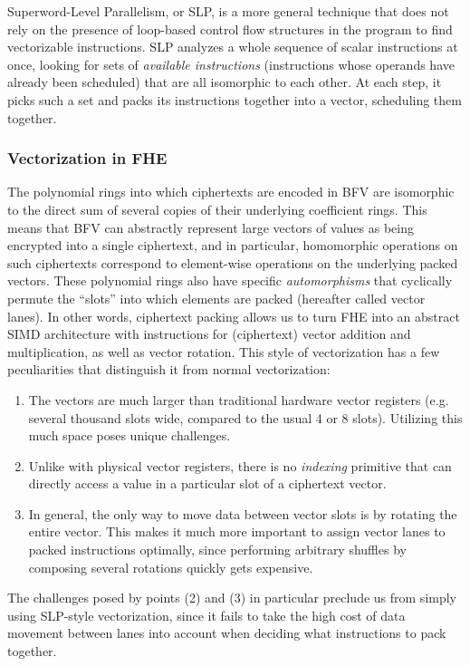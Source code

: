 Superword-Level Parallelism, or SLP, is a more general technique that does not rely on the presence of loop-based control flow structures in the program to find vectorizable instructions.
SLP analyzes a whole sequence of scalar instructions at once, looking for sets of {\em available instructions} (instructions whose operands have already been scheduled) that are all isomorphic to each other.
At each step, it picks such a set and packs its instructions together into a vector, scheduling them together.

\subsubsection{Vectorization in FHE}
The polynomial rings into which ciphertexts are encoded in BFV are isomorphic to the direct sum of several copies of their underlying coefficient rings.
This means that BFV can abstractly represent large vectors of values as being encrypted into a single ciphertext, and in particular, homomorphic operations on such ciphertexts correspond to element-wise operations on the underlying packed vectors.
These polynomial rings also have specific {\em automorphisms} that cyclically permute the ``slots'' into which elements are packed (hereafter called vector lanes). 
In other words, ciphertext packing allows us to turn FHE into an abstract SIMD architecture with instructions for (ciphertext) vector addition and multiplication, as well as vector rotation.
This style of vectorization has a few peculiarities that distinguish it from normal vectorization:
\begin{enumerate}
    \item The vectors are much larger than traditional hardware vector registers (e.g. several thousand slots wide, compared to the usual 4 or 8 slots). Utilizing this much space poses unique challenges.
    \item Unlike with physical vector registers, there is no {\em indexing} primitive that can directly access a value in a particular slot of a ciphertext vector.
    \item In general, the only way to move data between vector slots is by rotating the entire vector. This makes it much more important to assign vector lanes to packed instructions optimally, since performing arbitrary shuffles by composing several rotations quickly gets expensive.
\end{enumerate}
The challenges posed by points (2) and (3) in particular preclude us from simply using SLP-style vectorization, since it fails to take the high cost of data movement between lanes into account when deciding what instructions to pack together.
